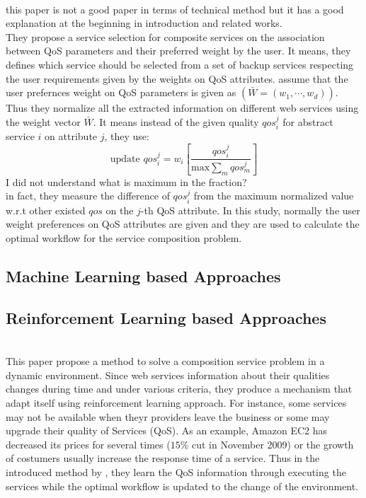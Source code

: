 \documentclass[10pt,journal,compsoc]{IEEEtran}
\begin{document}
 
\cite{ARASI2017}\\
{\color{red} this paper is not a good paper in terms of technical method but it has a good explanation at the beginning in introduction and related works.} \\
They propose a service selection for composite services on the association between QoS parameters and their preferred weight by the user. It means, they defines which service should be selected from a set of backup services respecting the user requirements given by the weights on QoS attributes. \cite{ARASI2017} assume that the user prefernces weight on QoS parameters is given as $(\bar{W} = (w_1, \cdots, w_d))$. Thus they normalize all the extracted information on different web services using the weight vector $\bar{W}$. It means instead of the given quality $qos_i^j$ for abstract service $i$ on attribute $j$, they use:
\begin{equation}
\text{update } qos_i^j =  w_i \left[ \frac{qos_i^j}{\text{max} \sum_m qos_m^j} \right]
\end{equation}
{\color{red}I did not understand what is maximum in the fraction?}\\
in fact, they measure the difference of $qos_i^j$ from the maximum normalized value w.r.t other existed $qos$ on the $j$-th QoS attribute. In this study, normally the user weight preferences on QoS attributes are given and they are used to calculate the optimal workflow for the service composition problem.

\subsection{Machine Learning based Approaches}

\subsection{Reinforcement Learning  based Approaches}
 
  \cite{Wang2010}\\
This paper propose a method to solve a composition service problem in a dynamic environment. Since web services information about their qualities changes during time and 
under various criteria, they produce a mechanism that adapt itself using reinforcement learning approach. For instance, some services may not be available when theyr providers leave the business or some may upgrade their quality of Services (QoS). As an example, Amazon EC2 has decreased its prices for several times ($15\%$ cut in November 2009) or the growth of costumers usually increase the response time of a service. Thus  in the introduced method by \cite{Wang2010}, they learn the QoS information through executing the services while the optimal workflow is updated to the change of the environment. 
\end{document}
